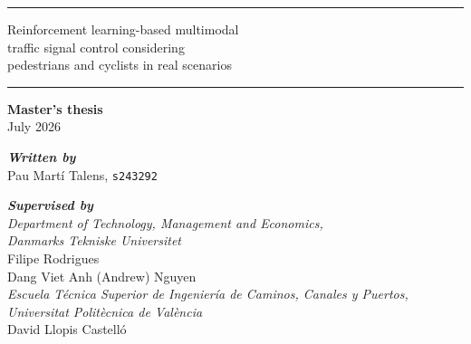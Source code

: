 
\thispagestyle{empty}

{\centering

\hrule\vspace{0.4cm}
{\LARGE Reinforcement learning-based multimodal\\traffic signal control considering\\pedestrians and cyclists in real scenarios\\[0.4cm]} %
\hrule\vspace{0.4cm}}\par

\vspace{9cm}
\begin{flushleft}
{\large \textbf{Master's thesis}}\\
July 2026

\bigskip

\textit{\textbf{Written by}}\\[.1cm]
Pau Martí Talens, \texttt{s243292}

\bigskip

\textit{\textbf{Supervised by}}\\[.1cm]
{\small \textit{Department of Technology, Management and Economics,\\
Danmarks Tekniske Universitet}}\\
Filipe Rodrigues\\
Dang Viet Anh (Andrew) Nguyen\\[.1cm] 
{\small \textit{Escuela Técnica Superior de Ingeniería de Caminos, Canales y Puertos,\\
Universitat Politècnica de València}}\\
David Llopis Castelló\\[.3cm]
\end{flushleft}


